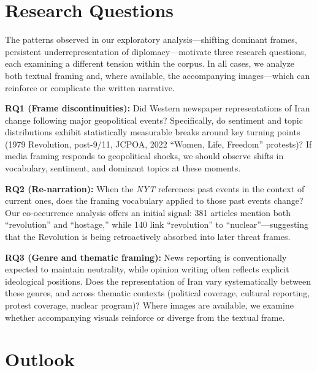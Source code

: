 \documentclass{dhnbpub}
\begin{document}
\section{Research Questions}

The patterns observed in our exploratory analysis---shifting dominant frames, persistent underrepresentation of diplomacy---motivate three research questions, each examining a different tension within the corpus. In all cases, we analyze both textual framing and, where available, the accompanying images---which can reinforce or complicate the written narrative.

\textbf{RQ1 (Frame discontinuities):} Did Western newspaper representations of Iran change following major geopolitical events? Specifically, do sentiment and topic distributions exhibit statistically measurable breaks around key turning points (1979 Revolution, post-9/11, JCPOA, 2022 ``Women, Life, Freedom'' protests)? If media framing responds to geopolitical shocks, we should observe shifts in vocabulary, sentiment, and dominant topics at these moments.

\textbf{RQ2 (Re-narration):} When the \textit{NYT} references past events in the context of current ones, does the framing vocabulary applied to those past events change? Our co-occurrence analysis offers an initial signal: 381 articles mention both ``revolution'' and ``hostage,'' while 140 link ``revolution'' to ``nuclear''---suggesting that the Revolution is being retroactively absorbed into later threat frames.

\textbf{RQ3 (Genre and thematic framing):} News reporting is conventionally expected to maintain neutrality, while opinion writing often reflects explicit ideological positions. Does the representation of Iran vary systematically between these genres, and across thematic contexts (political coverage, cultural reporting, protest coverage, nuclear program)? Where images are available, we examine whether accompanying visuals reinforce or diverge from the textual frame.

\section{Outlook}
\end{document}

